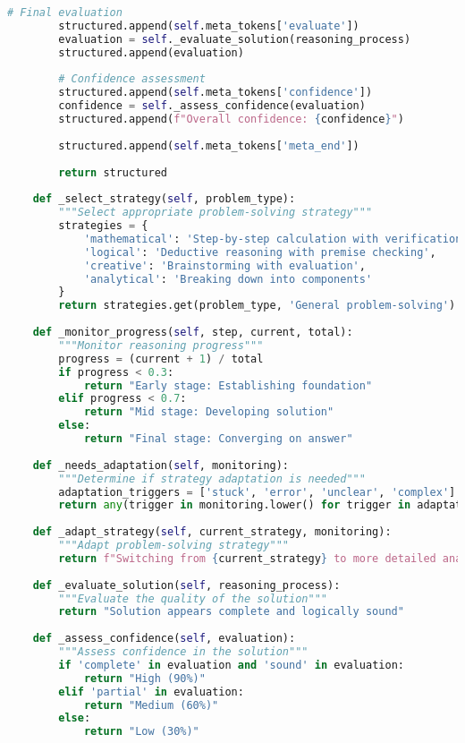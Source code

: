 \begin{lstlisting}[language=Python, caption=Metacognitive reasoning tokens]
        # Final evaluation
        structured.append(self.meta_tokens['evaluate'])
        evaluation = self._evaluate_solution(reasoning_process)
        structured.append(evaluation)
        
        # Confidence assessment
        structured.append(self.meta_tokens['confidence'])
        confidence = self._assess_confidence(evaluation)
        structured.append(f"Overall confidence: {confidence}")
        
        structured.append(self.meta_tokens['meta_end'])
        
        return structured
    
    def _select_strategy(self, problem_type):
        """Select appropriate problem-solving strategy"""
        strategies = {
            'mathematical': 'Step-by-step calculation with verification',
            'logical': 'Deductive reasoning with premise checking',
            'creative': 'Brainstorming with evaluation',
            'analytical': 'Breaking down into components'
        }
        return strategies.get(problem_type, 'General problem-solving')
    
    def _monitor_progress(self, step, current, total):
        """Monitor reasoning progress"""
        progress = (current + 1) / total
        if progress < 0.3:
            return "Early stage: Establishing foundation"
        elif progress < 0.7:
            return "Mid stage: Developing solution"
        else:
            return "Final stage: Converging on answer"
    
    def _needs_adaptation(self, monitoring):
        """Determine if strategy adaptation is needed"""
        adaptation_triggers = ['stuck', 'error', 'unclear', 'complex']
        return any(trigger in monitoring.lower() for trigger in adaptation_triggers)
    
    def _adapt_strategy(self, current_strategy, monitoring):
        """Adapt problem-solving strategy"""
        return f"Switching from {current_strategy} to more detailed analysis"
    
    def _evaluate_solution(self, reasoning_process):
        """Evaluate the quality of the solution"""
        return "Solution appears complete and logically sound"
    
    def _assess_confidence(self, evaluation):
        """Assess confidence in the solution"""
        if 'complete' in evaluation and 'sound' in evaluation:
            return "High (90%)"
        elif 'partial' in evaluation:
            return "Medium (60%)"
        else:
            return "Low (30%)"
\end{lstlisting}

